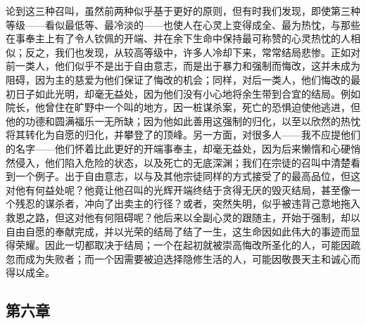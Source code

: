 论到这三种召叫，虽然前两种似乎基于更好的原则，但有时我们发现，即使第三种等级——看似最低等、最冷淡的——也使人在心灵上变得成全、最为热忱，与那些在事奉主上有了令人钦佩的开端、并在余下生命中保持最可称赞的心灵热忱的人相似；反之，我们也发现，从较高等级中，许多人冷却下来，常常结局悲惨。正如对前一类人，他们似乎不是出于自由意志，而是出于暴力和强制而悔改，这并未成为阻碍，因为主的慈爱为他们保证了悔改的机会；同样，对后一类人，他们悔改的最初日子如此光明，却毫无益处，因为他们没有小心地将余生带到合宜的结局。例如院长，他曾住在旷野中一个叫的地方，因一桩谋杀案，死亡的恐惧迫使他逃进，但他的功德和圆满福乐一无所缺；因为他如此善用这强制的归化，以至以欣然的热忱将其转化为自愿的归化，并攀登了的顶峰。另一方面，对很多人——我不应提他们的名字——他们怀着比此更好的开端事奉主，却毫无益处，因为后来懒惰和心硬悄然侵入，他们陷入危险的状态，以及死亡的无底深渊；我们在宗徒的召叫中清楚看到一个例子。出于自由意志，以与及其他宗徒同样的方式接受了的最高品位，但这对他有何益处呢？他竟让他召叫的光辉开端终结于贪得无厌的毁灭结局，甚至像一个残忍的谋杀者，冲向了出卖主的行径？或者，突然失明，似乎被违背己意地拖入救恩之路，但这对他有何阻碍呢？他后来以全副心灵的跟随主，开始于强制，却以自由自愿的奉献完成，并以光荣的结局了结了一生，这生命因如此伟大的事迹而显得荣耀。因此一切都取决于结局；一个在起初就被崇高悔改所圣化的人，可能因疏忽而成为失败者；而一个因需要被迫选择隐修生活的人，可能因敬畏天主和诚心而得以成全。\par


\subsection{第六章}

\par

